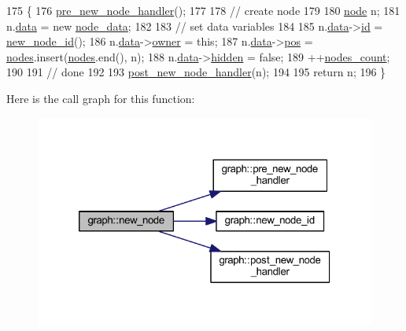 \begin{DoxyCode}
175 \{
176     \mbox{\hyperlink{classgraph_afb7606eaa8d673b6599af24437c0546c}{pre\_new\_node\_handler}}();
177 
178     \textcolor{comment}{// create node}
179     
180     \mbox{\hyperlink{classnode}{node}} n;
181     n.\mbox{\hyperlink{classnode_a4ae3d54ebb61be3a102bedf5b91bef75}{data}} = \textcolor{keyword}{new} \mbox{\hyperlink{classnode__data}{node\_data}};
182 
183     \textcolor{comment}{// set data variables}
184 
185     n.\mbox{\hyperlink{classnode_a4ae3d54ebb61be3a102bedf5b91bef75}{data}}->\mbox{\hyperlink{classnode__data_ac87541ac4470e3c17df808ec9a67f6c4}{id}} = \mbox{\hyperlink{classgraph_a4c9af44fa03250994dd1dd972bd7cdfc}{new\_node\_id}}();
186     n.\mbox{\hyperlink{classnode_a4ae3d54ebb61be3a102bedf5b91bef75}{data}}->\mbox{\hyperlink{classnode__data_a20acb07c56fa28df6cbdbf3b0a02cb66}{owner}} = \textcolor{keyword}{this};
187     n.\mbox{\hyperlink{classnode_a4ae3d54ebb61be3a102bedf5b91bef75}{data}}->\mbox{\hyperlink{classnode__data_ab3deb00e39c12058e58a99a38507f344}{pos}} = \mbox{\hyperlink{classgraph_a4ea0592e8eb7c26c5abad24546907726}{nodes}}.insert(\mbox{\hyperlink{classgraph_a4ea0592e8eb7c26c5abad24546907726}{nodes}}.end(), n);
188     n.\mbox{\hyperlink{classnode_a4ae3d54ebb61be3a102bedf5b91bef75}{data}}->\mbox{\hyperlink{classnode__data_a0a841a84f5038562908d726392ce1b55}{hidden}} = \textcolor{keyword}{false};
189     ++\mbox{\hyperlink{classgraph_a1f59223d0bcf647920963d7a661dd74a}{nodes\_count}};
190 
191     \textcolor{comment}{// done}
192     
193     \mbox{\hyperlink{classgraph_acfe5bc8bdad9fa426750901144319e5f}{post\_new\_node\_handler}}(n);
194 
195     \textcolor{keywordflow}{return} n;
196 \}
\end{DoxyCode}
Here is the call graph for this function\+:
\nopagebreak
\begin{figure}[H]
\begin{center}
\leavevmode
\includegraphics[width=320pt]{classgraph_ab9505335c20558319b6cce25aed23524_cgraph}
\end{center}
\end{figure}
